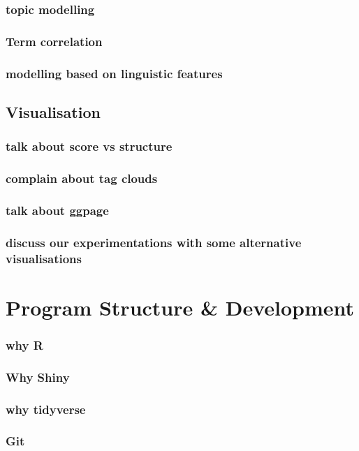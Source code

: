 \documentclass[11pt, a4paper, oneside]{report}
\begin{document}
\subsection{topic modelling}
\subsection{Term correlation}
\subsection{modelling based on linguistic features}

\section{Visualisation}
\label{sec:visualisation-1}

\subsection{talk about score vs structure}
\subsection{complain about tag clouds}
\subsection{talk about ggpage}
\subsection{discuss our experimentations with some alternative visualisations}
\chapter{Program Structure \& Development}
\label{cha:program-structure}

\subsection{why R}
\subsection{Why Shiny}
\subsection{why tidyverse}
\subsection{Git}
\end{document}
